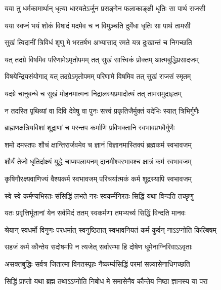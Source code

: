 \twolineshloka
{यया तु धर्मकामार्थान् धृत्या धारयतेऽर्जुन}
{प्रसङ्गेन फलाकाङ्क्षी धृतिः सा पार्थ राजसी}%

\twolineshloka
{यया स्वप्नं भयं शोकं विषादं मदमेव च}
{न विमुञ्चति दुर्मेधा धृतिः सा पार्थ तामसी}%

\twolineshloka
{सुखं त्विदानीं त्रिविधं शृणु मे भरतर्षभ}
{अभ्यासाद् रमते यत्र दुःखान्तं च निगच्छति}%

\twolineshloka
{यत् तदग्रे विषमिव परिणामेऽमृतोपमम्}
{तत् सुखं सात्त्विकं प्रोक्तम् आत्मबुद्धिप्रसादजम्}%

\twolineshloka
{विषयेन्द्रियसंयोगाद् यत् तदग्रेऽमृतोपमम्}
{परिणामे विषमिव तत् सुखं राजसं स्मृतम्}%

\twolineshloka
{यदग्रे चानुबन्धे च सुखं मोहनमात्मनः}
{निद्रालस्यप्रमादोत्थं तत् तामसमुदाहृतम्}%

\twolineshloka
{न तदस्ति पृथिव्यां वा दिवि देवेषु वा पुनः}
{सत्त्वं प्रकृतिजैर्मुक्तं यदेभिः स्यात् त्रिभिर्गुणैः}%

\twolineshloka
{ब्राह्मणक्षत्रियविशां शूद्राणां च परन्तप}
{कर्माणि प्रविभक्तानि स्वभावप्रभवैर्गुणैः}%

\twolineshloka
{शमो दमस्तपः शौचं क्षान्तिरार्जवमेव च}
{ज्ञानं विज्ञानमास्तिक्यं ब्रह्मकर्म स्वभावजम्}%

\twolineshloka
{शौर्यं तेजो धृतिर्दाक्ष्यं युद्धे चाप्यपलायनम्}
{दानमीश्वरभावश्च क्षात्रं कर्म स्वभावजम्}%

\twolineshloka
{कृषिगौरक्ष्यवाणिज्यं वैश्यकर्म स्वभावजम्}
{परिचर्यात्मकं कर्म शूद्रस्यापि स्वभावजम्}%

\twolineshloka
{स्वे स्वे कर्मण्यभिरतः संसिद्धिं लभते नरः}
{स्वकर्मनिरतः सिद्धिं यथा विन्दति तच्छृणु}%

\twolineshloka
{यतः प्रवृत्तिर्भूतानां येन सर्वमिदं ततम्}
{स्वकर्मणा तमभ्यर्च्य सिद्धिं विन्दति मानवः}%

\twolineshloka
{श्रेयान् स्वधर्मो विगुणः परधर्मात् स्वनुष्ठितात्}
{स्वभावनियतं कर्म कुर्वन् नाऽऽप्नोति किल्बिषम्}%

\twolineshloka
{सहजं कर्म कौन्तेय सदोषमपि न त्यजेत्}
{सर्वारम्भा हि दोषेण धूमेनाग्निरिवाऽऽवृताः}%

\twolineshloka
{असक्तबुद्धिः सर्वत्र जितात्मा विगतस्पृहः}
{नैष्कर्म्यसिद्धिं परमां सन्न्यासेनाधिगच्छति}%

\twolineshloka
{सिद्धिं प्राप्तो यथा ब्रह्म तथाऽऽप्नोति निबोध मे}
{समासेनैव कौन्तेय निष्ठा ज्ञानस्य या परा}%

